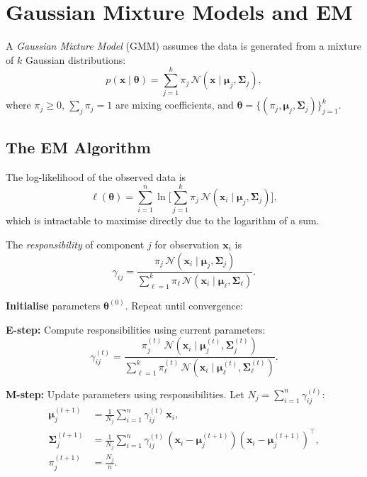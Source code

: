 \section{Gaussian Mixture Models and EM}

\begin{definition}
A \emph{Gaussian Mixture Model} (GMM) assumes the data is generated from a mixture of $k$ Gaussian distributions:
\[
  p(\bm{x}\mid\bm{\theta}) = \sum_{j=1}^k \pi_j\,\mathcal{N}(\bm{x}\mid\bm{\mu}_j,\bm{\Sigma}_j),
\]
where $\pi_j\geq 0$, $\sum_j\pi_j=1$ are mixing coefficients, and $\bm{\theta}=\{(\pi_j,\bm{\mu}_j,\bm{\Sigma}_j)\}_{j=1}^k$.
\end{definition}

\subsection{The EM Algorithm}

The log-likelihood of the observed data is
\[
  \ell(\bm{\theta}) = \sum_{i=1}^n \ln\Biggl[\sum_{j=1}^k \pi_j\,\mathcal{N}(\bm{x}_i\mid\bm{\mu}_j,\bm{\Sigma}_j)\Biggr],
\]
which is intractable to maximise directly due to the logarithm of a sum.

\begin{definition}[Responsibilities]
The \emph{responsibility} of component $j$ for observation $\bm{x}_i$ is
\[
  \gamma_{ij} = \frac{\pi_j\,\mathcal{N}(\bm{x}_i\mid\bm{\mu}_j,\bm{\Sigma}_j)}
  {\sum_{\ell=1}^k \pi_\ell\,\mathcal{N}(\bm{x}_i\mid\bm{\mu}_\ell,\bm{\Sigma}_\ell)}.
\]
\end{definition}

\begin{algorithme}[title=\textbf{EM Algorithm for GMM}]
\textbf{Initialise} parameters $\bm{\theta}^{(0)}$. Repeat until convergence:

\medskip\noindent\textbf{E-step:} Compute responsibilities using current parameters:
\[
  \gamma_{ij}^{(t)} = \frac{\pi_j^{(t)}\,\mathcal{N}(\bm{x}_i\mid\bm{\mu}_j^{(t)},\bm{\Sigma}_j^{(t)})}
  {\sum_{\ell=1}^k \pi_\ell^{(t)}\,\mathcal{N}(\bm{x}_i\mid\bm{\mu}_\ell^{(t)},\bm{\Sigma}_\ell^{(t)})}.
\]

\medskip\noindent\textbf{M-step:} Update parameters using responsibilities. Let $N_j=\sum_{i=1}^n\gamma_{ij}^{(t)}$:
\begin{align}
  \bm{\mu}_j^{(t+1)} &= \frac{1}{N_j}\sum_{i=1}^n \gamma_{ij}^{(t)}\,\bm{x}_i, \label{eq:em-mu}\\
  \bm{\Sigma}_j^{(t+1)} &= \frac{1}{N_j}\sum_{i=1}^n \gamma_{ij}^{(t)}\,(\bm{x}_i-\bm{\mu}_j^{(t+1)})(\bm{x}_i-\bm{\mu}_j^{(t+1)})^\top, \label{eq:em-sigma}\\
  \pi_j^{(t+1)} &= \frac{N_j}{n}. \label{eq:em-pi}
\end{align}
\end{algorithme}

